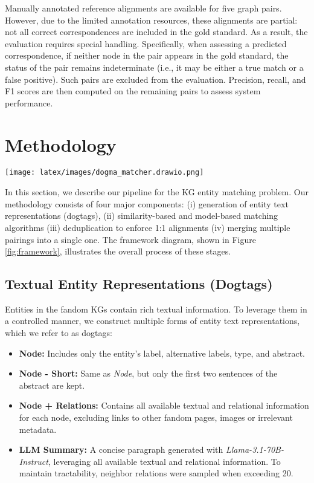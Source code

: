 \documentclass[11pt]{article}
\begin{document}
Manually annotated reference alignments are available for five graph pairs. However, due to the limited annotation resources, these alignments are partial: not all correct correspondences are included in the gold standard. As a result, the evaluation requires special handling. Specifically, when assessing a predicted correspondence, if neither node in the pair appears in the gold standard, the status of the pair remains indeterminate (i.e., it may be either a true match or a false positive). Such pairs are excluded from the evaluation. Precision, recall, and F1 scores are then computed on the remaining pairs to assess system performance.

\section{Methodology}

\begin{figure*}[t] %
    \centering
    \texttt{[image: latex/images/dogma\_matcher.drawio.png]}
    \caption{Proposed KG entity matching framework}
    \label{fig:framework}
\end{figure*}

In this section, we describe our pipeline for the KG entity matching problem. Our methodology consists of four major components: (i) generation of entity text representations (dogtags), (ii) similarity-based and model-based matching algorithms (iii) deduplication to enforce 1:1 alignments (iv) merging multiple pairings into a single one. The framework diagram, shown in Figure \ref{fig:framework}, illustrates the overall process of these stages.

\subsection{Textual Entity Representations (Dogtags)}

Entities in the fandom KGs contain rich textual information. To leverage them in a controlled manner, we construct multiple forms of entity text representations, which we refer to as dogtags:

\begin{itemize}[nosep]
    \setlength\itemsep{0em}
    \setlength\parskip{0em}
    \setlength\parsep{0em}
    \item \textbf{Node:} Includes only the entity’s label, alternative labels, type, and abstract.
    \item \textbf{Node - Short:} Same as \emph{Node}, but only the first two sentences of the abstract are kept.
    \item \textbf{Node + Relations:} Contains all available textual and relational information for each node, excluding links to other fandom pages, images or irrelevant metadata.
    \item \textbf{LLM Summary:} A concise paragraph generated with \emph{Llama-3.1-70B-Instruct}, leveraging all available textual and relational information. To maintain tractability, neighbor relations were sampled when exceeding 20.
\end{itemize}
\end{document}
